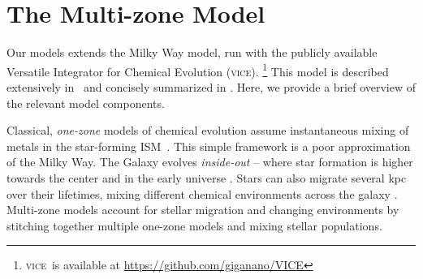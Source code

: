 \documentclass[fleqn,
usenatbib]{mnras}
\newcommand{\JJ}{\citetalias{james+21}}
\newcommand{\VICE}{\textsc{vice}}
\begin{document}
\section{The Multi-zone Model}\label{sec:vice}

Our models extends the \citet[hereafter \JJ]{james+21} Milky Way model, run with the publicly available Versatile Integrator for Chemical Evolution (\VICE).%
    \footnote{\VICE~is available at \url{https://github.com/giganano/VICE}}
This model is described extensively in \JJ~and concisely summarized  in \citet{james+23}. Here, we provide a brief overview of the relevant model components.

Classical, \textit{one-zone} models of chemical evolution assume instantaneous mixing of metals in the star-forming ISM\ \citep[e.g.][]{matteucci21}. This simple framework is a poor approximation of the Milky Way.  The Galaxy evolves \textit{inside-out} -- where star formation is higher towards the center and in the early universe \citep{WF91, kauffmann96, bird+13}. Stars can also migrate several kpc over their lifetimes, mixing different chemical environments across the galaxy \citep{bird+12,sellwood+binney02}. Multi-zone models account for stellar migration and changing environments by stitching together multiple one-zone models and mixing stellar populations. 
\end{document}
